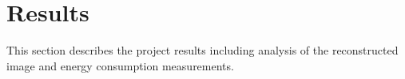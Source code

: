 \chapter{Results}
\vspace{-0.5 cm}
This section describes the project results including analysis of the reconstructed image and energy consumption measurements. \vspace{-0.5 cm}
